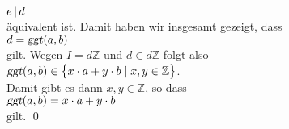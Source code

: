 \hspace*{1.3cm}
$e \,|\, d$
\\[0.2cm]
\"{a}quivalent ist.  Damit haben wir insgesamt gezeigt, dass
\\[0.2cm]
\hspace*{1.3cm}
 $d = \textsl{ggt}(a,b)$ 
\\[0.2cm]
gilt.  Wegen $I = d\mathbb{Z}$ und $d \in d\mathbb{Z}$ folgt also 
\\[0.2cm]
\hspace*{1.3cm}
$\textsl{ggt}(a,b) \in \bigl\{ x \cdot a + y \cdot b \mid x,y \in \mathbb{Z} \bigr\}$.
\\[0.2cm]
Damit gibt es dann $x,y \in \mathbb{Z}$, so dass
\\[0.2cm]
\hspace*{1.3cm}
$\textsl{ggt}(a,b) = x \cdot a + y \cdot b$
\\[0.2cm]
gilt.  \qed

